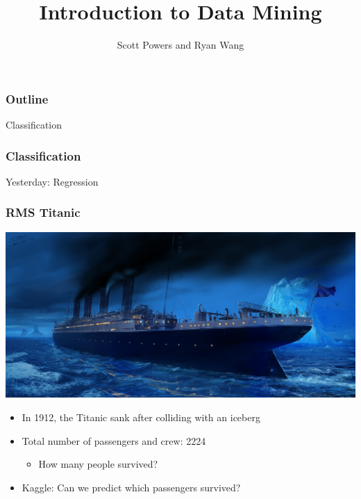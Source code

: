 \documentclass{beamer}
\title{Introduction to Data Mining}
\author{Scott Powers and Ryan Wang}
\begin{document}
\begin{frame}
\titlepage
\end{frame}

\begin{frame}
\frametitle{Outline}
Classification
\end{frame}

\begin{frame}
\frametitle{Classification}
Yesterday: Regression
\end{frame}

\begin{frame}
\frametitle{RMS Titanic}
\begin{center}
\includegraphics[scale = .15]{titanic.jpg}
\end{center}
\begin{itemize}
\item In 1912, the Titanic sank after colliding with an iceberg
\item Total number of passengers and crew: 2224
\begin{itemize}
\item How many people survived? 
\end{itemize}
\item Kaggle: Can we predict which passengers survived?
\end{itemize}
\end{frame}
\end{document}
